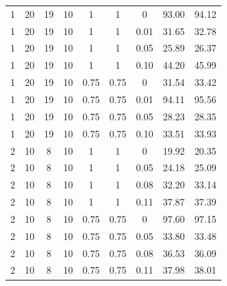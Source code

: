 \begin{table}[H]
\begin{tabular}{cccccccrr}
	1  			& 20     			& 19			& 10				& 1						& 1      				& 0			      		& 93.00 				& 94.12\\ 
	1      		& 20     			& 19     		& 10     			& 1      				& 1      				& 0.01    				& 31.65    				& 32.78\\ 
	1      		& 20     			& 19     		& 10     			& 1      				& 1      				& 0.05    				& 25.89    				& 26.37\\
	1      		& 20     			& 19     		& 10     			& 1      				& 1      				& 0.10    				& 44.20    				& 45.99\\
	1      		& 20     			& 19     		& 10     			& 0.75      			& 0.75      			& 0	    				& 31.54    				& 33.42\\
	1      		& 20     			& 19     		& 10     			& 0.75      			& 0.75      			& 0.01    				& 94.11    				& 95.56\\
	1      		& 20     			& 19     		& 10     			& 0.75      			& 0.75      			& 0.05    				& 28.23    				& 28.35\\
	1      		& 20     			& 19     		& 10     			& 0.75      			& 0.75      			& 0.10    				& 33.51    				& 33.93\\
	
	
	2 			& 10     			& 8 			& 10     			& 1 					& 1 					& 0 					& 19.92    				& 20.35\\
	2 			& 10     			& 8 			& 10     			& 1 					& 1 					& 0.05   				& 24.18    				& 25.09\\
	2 			& 10     			& 8 			& 10     			& 1 					& 1 					& 0.08    				& 32.20    				& 33.14\\
	2 			& 10     			& 8 			& 10     			& 1 					& 1 					& 0.11    				& 37.87    				& 37.39\\	
	2 			& 10     			& 8 			& 10     			& 0.75    				& 0.75    				& 0 					& 97.60    				& 97.15\\
	2 			& 10     			& 8 			& 10     			& 0.75    				& 0.75    				& 0.05    				& 33.80    				& 33.48\\
	2 			& 10     			& 8 			& 10     			& 0.75    				& 0.75    				& 0.08    				& 36.53    				& 36.09\\
	2 			& 10     			& 8 			& 10     			& 0.75    				& 0.75    				& 0.11    				& 37.98    				& 38.01\\


\end{tabular}
\end{table}
